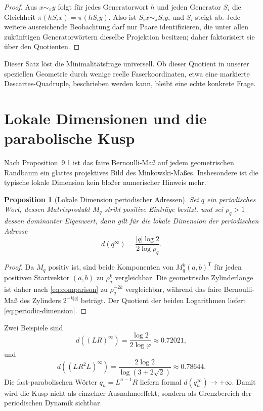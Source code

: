 \documentclass[11pt,a4paper]{article}
\newtheorem{proposition}[remark]{Proposition}
\begin{document}
\begin{proof}
Aus $x\sim_\pi y$ folgt für jedes Generatorwort $h$ und jeden Generator
$S_i$ die Gleichheit $\pi(hS_ix)=\pi(hS_iy)$. Also ist
$S_ix\sim_\pi S_iy$, und $S_i$ steigt ab. Jede weitere ausreichende
Beobachtung darf nur Paare identifizieren, die unter allen zukünftigen
Generatorwörtern dieselbe Projektion besitzen; daher faktorisiert sie über
den Quotienten.
\end{proof}

Dieser Satz löst die Minimalitätsfrage universell. Ob dieser Quotient in
unserer speziellen Geometrie durch wenige reelle Faserkoordinaten, etwa eine
markierte Descartes-Quadruple, beschrieben werden kann, bleibt eine echte
konkrete Frage.

\section{Lokale Dimensionen und die parabolische Kusp}

Nach Proposition~9.1 ist das faire Bernoulli-Maß auf jedem geometrischen
Randbaum ein glattes projektives Bild des Minkowski-Maßes. Insbesondere ist
die typische lokale Dimension kein bloßer numerischer Hinweis mehr.

\begin{proposition}[Lokale Dimension periodischer Adressen]
Sei $q$ ein periodisches Wort, dessen Matrixprodukt $M_q$ strikt positive
Einträge besitzt, und sei
$\rho_q>1$ dessen dominanter Eigenwert, dann gilt für die lokale Dimension
der periodischen Adresse
\begin{equation}\label{eq:periodic-dimension}
 d(q^\infty)=\frac{|q|\log2}{2\log\rho_q}.
\end{equation}
\end{proposition}
\begin{proof}
Da $M_q$ positiv ist, sind beide Komponenten von
$M_q^k(a,b)^{\mathsf T}$ für jeden positiven Startvektor $(a,b)$ zu
$\rho_q^k$ vergleichbar. Die geometrische Zylinderlänge ist daher nach
\eqref{eq:comparison} zu $\rho_q^{-2k}$ vergleichbar, während das faire
Bernoulli-Maß des Zylinders $2^{-k|q|}$ beträgt. Der Quotient der beiden
Logarithmen liefert \eqref{eq:periodic-dimension}.
\end{proof}

Zwei Beispiele sind
\[
 d((LR)^\infty)=\frac{\log2}{2\log\varphi}\approx0.72021,
\]
und
\[
 d((LR^2L)^\infty)=
 \frac{2\log2}{\log(3+2\sqrt2)}\approx0.78644.
\]
Die fast-parabolischen Wörter $q_n=L^{n-1}R$ liefern formal
$d(q_n^\infty)\to+\infty$. Damit wird die Kusp nicht als einzelner
Ausnahmeeffekt, sondern als Grenzbereich der periodischen Dynamik sichtbar.
\end{document}
